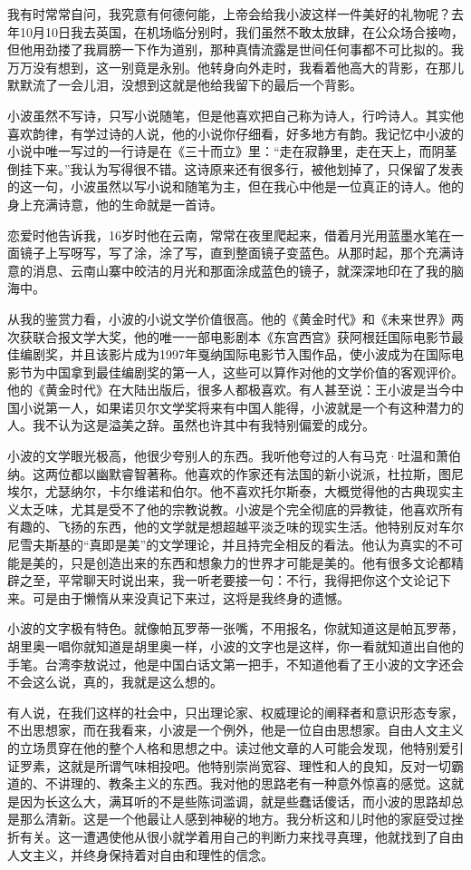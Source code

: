 我有时常常自问，我究意有何德何能，上帝会给我小波这样一件美好的礼物呢？去年10月10日我去英国，在机场临分别时，我们虽然不敢太放肆，在公众场合接吻，但他用劲搂了我肩膀一下作为道别，那种真情流露是世间任何事都不可比拟的。我万万没有想到，这一别竟是永别。他转身向外走时，我看着他高大的背影，在那儿默默流了一会儿泪，没想到这就是他给我留下的最后一个背影。 

小波虽然不写诗，只写小说随笔，但是他喜欢把自己称为诗人，行吟诗人。其实他喜欢韵律，有学过诗的人说，他的小说你仔细看，好多地方有韵。我记忆中小波的小说中唯一写过的一行诗是在《三十而立》里：“走在寂静里，走在天上，而阴茎倒挂下来。”我认为写得很不错。这诗原来还有很多行，被他划掉了，只保留了发表的这一句，小波虽然以写小说和随笔为主，但在我心中他是一位真正的诗人。他的身上充满诗意，他的生命就是一首诗。 

恋爱时他告诉我，16岁时他在云南，常常在夜里爬起来，借着月光用蓝墨水笔在一面镜子上写呀写，写了涂，涂了写，直到整面镜子变蓝色。从那时起，那个充满诗意的消息、云南山寨中皎洁的月光和那面涂成蓝色的镜子，就深深地印在了我的脑海中。 

从我的鉴赏力看，小波的小说文学价值很高。他的《黄金时代》和《未来世界》两次获联合报文学大奖，他的唯一一部电影剧本《东宫西宫》获阿根廷国际电影节最佳编剧奖，并且该影片成为1997年戛纳国际电影节入围作品，使小波成为在国际电影节为中国拿到最佳编剧奖的第一人，这些可以算作对他的文学价值的客观评价。他的《黄金时代》在大陆出版后，很多人都极喜欢。有人甚至说：王小波是当今中国小说第一人，如果诺贝尔文学奖将来有中国人能得，小波就是一个有这种潜力的人。我不认为这是溢美之辞。虽然也许其中有我特别偏爱的成分。 

小波的文学眼光极高，他很少夸别人的东西。我听他夸过的人有马克·吐温和萧伯纳。这两位都以幽默睿智著称。他喜欢的作家还有法国的新小说派，杜拉斯，图尼埃尔，尤瑟纳尔，卡尔维诺和伯尔。他不喜欢托尔斯泰，大概觉得他的古典现实主义太乏味，尤其是受不了他的宗教说教。小波是个完全彻底的异教徒，他喜欢所有有趣的、飞扬的东西，他的文学就是想超越平淡乏味的现实生活。他特别反对车尔尼雪夫斯基的“真即是美”的文学理论，并且持完全相反的看法。他认为真实的不可能是美的，只是创造出来的东西和想象力的世界才可能是美的。他有很多文论都精辟之至，平常聊天时说出来，我一听老要接一句：不行，我得把你这个文论记下来。可是由于懒惰从来没真记下来过，这将是我终身的遗憾。 

小波的文字极有特色。就像帕瓦罗蒂一张嘴，不用报名，你就知道这是帕瓦罗蒂，胡里奥一唱你就知道是胡里奥一样，小波的文字也是这样，你一看就知道出自他的手笔。台湾李敖说过，他是中国白话文第一把手，不知道他看了王小波的文字还会不会这么说，真的，我就是这么想的。 

有人说，在我们这样的社会中，只出理论家、权威理论的阐释者和意识形态专家，不出思想家，而在我看来，小波是一个例外，他是一位自由思想家。自由人文主义的立场贯穿在他的整个人格和思想之中。读过他文章的人可能会发现，他特别爱引证罗素，这就是所谓气味相投吧。他特别崇尚宽容、理性和人的良知，反对一切霸道的、不讲理的、教条主义的东西。我对他的思路老有一种意外惊喜的感觉。这就是因为长这么大，满耳听的不是些陈词滥调，就是些蠢话傻话，而小波的思路却总是那么清新。这是一个他最让人感到神秘的地方。我分析这和儿时他的家庭受过挫折有关。这一遭遇使他从很小就学着用自己的判断力来找寻真理，他就找到了自由人文主义，并终身保持着对自由和理性的信念。 

